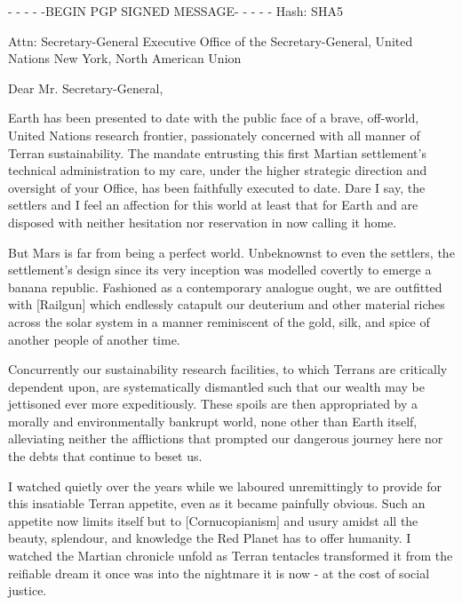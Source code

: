 
- - - - -BEGIN PGP SIGNED MESSAGE- - - - -
Hash: SHA5

Attn: Secretary-General
Executive Office of the Secretary-General, United Nations
New York, North American Union
\blank

Dear Mr. Secretary-General,

Earth has been presented to date with the public face of a brave, off-world, United Nations research frontier, passionately concerned with all manner of Terran sustainability. The mandate entrusting this first Martian settlement's technical administration to my care, under the higher strategic direction and oversight of your Office, has been faithfully executed to date. Dare I say, the settlers and I feel an affection for this world at least that for Earth and are disposed with neither hesitation nor reservation in now calling it home.

But Mars is far from being a perfect world. Unbeknownst to even the settlers, the settlement's design since its very inception was modelled covertly to emerge a banana republic. Fashioned as a contemporary analogue ought, we are outfitted with [Railgun] which endlessly catapult our deuterium and other material riches across the solar system in a manner reminiscent of the gold, silk, and spice of another people of another time.

Concurrently our sustainability research facilities, to which Terrans are critically dependent upon, are systematically dismantled such that our wealth may be jettisoned ever more expeditiously. These spoils are then appropriated by a morally and environmentally bankrupt world, none other than Earth itself, alleviating neither the afflictions that prompted our dangerous journey here nor the debts that continue to beset us.

I watched quietly over the years while we laboured unremittingly to provide for this insatiable Terran appetite, even as it became painfully obvious. Such an appetite now limits itself but to [Cornucopianism] and usury amidst all the beauty, splendour, and knowledge the Red Planet has to offer humanity. I watched the Martian chronicle unfold as Terran tentacles transformed it from the reifiable dream it once was into the nightmare it is now - at the cost of social justice. 

